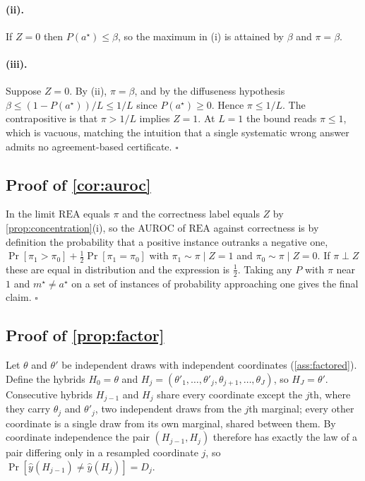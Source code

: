 \documentclass[11pt]{article}
\newcommand{\rea}{\mathrm{REA}}
\begin{document}
\paragraph{(ii).} If $Z = 0$ then $P(a^\star) \le \beta$, so the maximum in (i) is attained by $\beta$ and $\pi = \beta$.

\paragraph{(iii).} Suppose $Z = 0$. By (ii), $\pi = \beta$, and by the diffuseness hypothesis $\beta \le (1 - P(a^\star))/L \le 1/L$ since $P(a^\star) \ge 0$. Hence $\pi \le 1/L$. The contrapositive is that $\pi > 1/L$ implies $Z = 1$. At $L = 1$ the bound reads $\pi \le 1$, which is vacuous, matching the intuition that a single systematic wrong answer admits no agreement-based certificate. \hfill$\square$

\subsection{Proof of \texorpdfstring{\cref{cor:auroc}}{Corollary 1}}

In the limit $\rea$ equals $\pi$ and the correctness label equals $Z$ by \cref{prop:concentration}(i), so the AUROC of $\rea$ against correctness is by definition the probability that a positive instance outranks a negative one, $\Pr[\pi_1 > \pi_0] + \tfrac12\Pr[\pi_1 = \pi_0]$ with $\pi_1 \sim \pi \mid Z{=}1$ and $\pi_0 \sim \pi \mid Z{=}0$. If $\pi \perp Z$ these are equal in distribution and the expression is $\tfrac12$. Taking any $P$ with $\pi$ near $1$ and $m^\star \neq a^\star$ on a set of instances of probability approaching one gives the final claim. \hfill$\square$

\subsection{Proof of \texorpdfstring{\cref{prop:factor}}{Proposition 3}}

Let $\theta$ and $\theta'$ be independent draws with independent coordinates (\cref{ass:factored}). Define the hybrids $H_0 = \theta$ and $H_j = (\theta'_1,\dots,\theta'_j,\theta_{j+1},\dots,\theta_J)$, so $H_J = \theta'$. Consecutive hybrids $H_{j-1}$ and $H_j$ share every coordinate except the $j$th, where they carry $\theta_j$ and $\theta'_j$, two independent draws from the $j$th marginal; every other coordinate is a single draw from its own marginal, shared between them. By coordinate independence the pair $(H_{j-1}, H_j)$ therefore has exactly the law of a pair differing only in a resampled coordinate $j$, so $\Pr[\hat y(H_{j-1}) \neq \hat y(H_j)] = D_j$.
\end{document}

